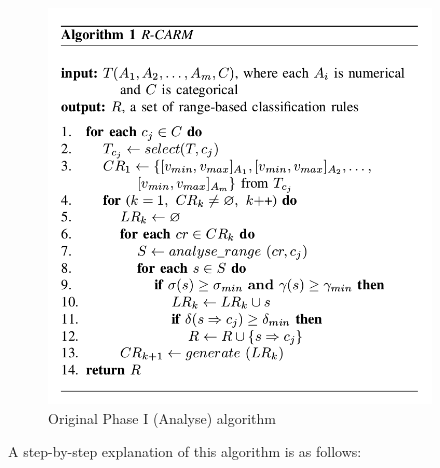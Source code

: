 \begin{figure}[!htbp]
    \centering
    \includegraphics[width=4in]{figures/DrShaoAlgorithm1}
    \caption[Figure 2.1: Original Phase I (Analyse) algorithm]{Original Phase I (Analyse) algorithm}
    \label{fig:figure2_1}
\end{figure}

A step-by-step explanation of this algorithm is as follows: 

